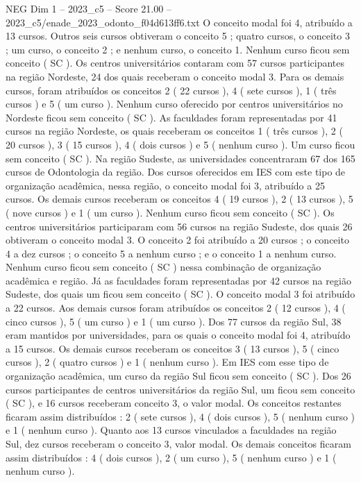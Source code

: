 \begin{textsample}{NEG Dim 1 – 2023\_c5 – Score 21.00 – 2023\_c5/enade\_2023\_odonto\_f04d613ff6.txt}
O conceito modal foi 4, atribuído a 13 cursos.
Outros seis cursos obtiveram o conceito 5 ; quatro cursos, o conceito 3 ; um curso, o conceito 2 ; e nenhum curso, o conceito 1.
Nenhum curso ficou sem conceito ( SC ).
Os centros universitários contaram com 57 cursos participantes na região Nordeste, 24 dos quais receberam o conceito modal 3.
Para os demais cursos, foram atribuídos os conceitos 2 ( 22 cursos ), 4 ( sete cursos ), 1 ( três cursos ) e 5 ( um curso ).
Nenhum curso oferecido por centros universitários no Nordeste ficou sem conceito ( SC ).
As faculdades foram representadas por 41 cursos na região Nordeste, os quais receberam os conceitos 1 ( três cursos ), 2 ( 20 cursos ), 3 ( 15 cursos ), 4 ( dois cursos ) e 5 ( nenhum curso ).
Um curso ficou sem conceito ( SC ).
Na região Sudeste, as universidades concentraram 67 dos 165 cursos de Odontologia da região.
Dos cursos oferecidos em IES com este tipo de organização acadêmica, nessa região, o conceito modal foi 3, atribuído a 25 cursos.
Os demais cursos receberam os conceitos 4 ( 19 cursos ), 2 ( 13 cursos ), 5 ( nove cursos ) e 1 ( um curso ).
Nenhum curso ficou sem conceito ( SC ).
Os centros universitários participaram com 56 cursos na região Sudeste, dos quais 26 obtiveram o conceito modal 3.
O conceito 2 foi atribuído a 20 cursos ; o conceito 4 a dez cursos ; o conceito 5 a nenhum curso ; e o conceito 1 a nenhum curso.
Nenhum curso ficou sem conceito ( SC ) nessa combinação de organização acadêmica e região.
Já as faculdades foram representadas por 42 cursos na região Sudeste, dos quais um ficou sem conceito ( SC ).
O conceito modal 3 foi atribuído a 22 cursos.
Aos demais cursos foram atribuídos os conceitos 2 ( 12 cursos ), 4 ( cinco cursos ), 5 ( um curso ) e 1 ( um curso ).
Dos 77 cursos da região Sul, 38 eram mantidos por universidades, para os quais o conceito modal foi 4, atribuído a 15 cursos.
Os demais cursos receberam os conceitos 3 ( 13 cursos ), 5 ( cinco cursos ), 2 ( quatro cursos ) e 1 ( nenhum curso ).
Em IES com esse tipo de organização acadêmica, um curso da região Sul ficou sem conceito ( SC ).
Dos 26 cursos participantes de centros universitários da região Sul, um ficou sem conceito ( SC ), e 16 cursos receberam conceito 3, o valor modal.
Os conceitos restantes ficaram assim distribuídos : 2 ( sete cursos ), 4 ( dois cursos ), 5 ( nenhum curso ) e 1 ( nenhum curso ).
Quanto aos 13 cursos vinculados a faculdades na região Sul, dez cursos receberam o conceito 3, valor modal.
Os demais conceitos ficaram assim distribuídos : 4 ( dois cursos ), 2 ( um curso ), 5 ( nenhum curso ) e 1 ( nenhum curso ).

\end{textsample}
